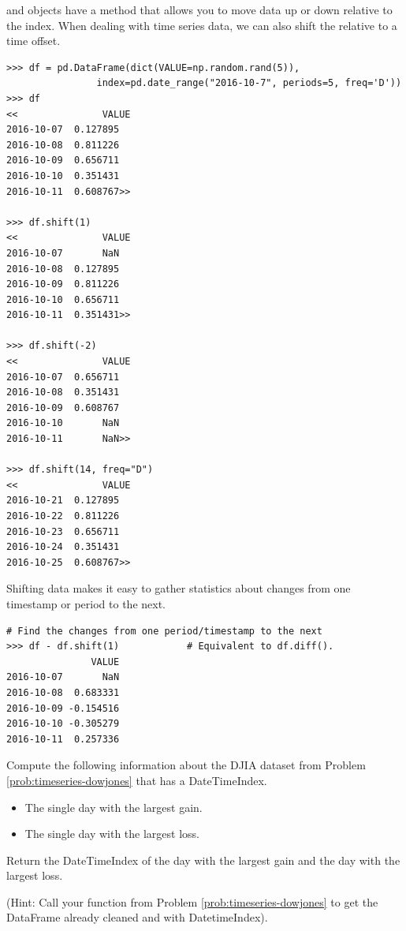  and  objects have a  method that allows you to move data up or down relative to the index.
When dealing with time series data, we can also shift the  relative to a time offset.

\begin{lstlisting}
>>> df = pd.DataFrame(dict(VALUE=np.random.rand(5)),
                index=pd.date_range("2016-10-7", periods=5, freq='D'))
>>> df
<<               VALUE
2016-10-07  0.127895
2016-10-08  0.811226
2016-10-09  0.656711
2016-10-10  0.351431
2016-10-11  0.608767>>

>>> df.shift(1)
<<               VALUE
2016-10-07       NaN
2016-10-08  0.127895
2016-10-09  0.811226
2016-10-10  0.656711
2016-10-11  0.351431>>

>>> df.shift(-2)
<<               VALUE
2016-10-07  0.656711
2016-10-08  0.351431
2016-10-09  0.608767
2016-10-10       NaN
2016-10-11       NaN>>

>>> df.shift(14, freq="D")
<<               VALUE
2016-10-21  0.127895
2016-10-22  0.811226
2016-10-23  0.656711
2016-10-24  0.351431
2016-10-25  0.608767>>
\end{lstlisting}

Shifting data makes it easy to gather statistics about changes from one timestamp or period to the next.

\begin{lstlisting}
# Find the changes from one period/timestamp to the next
>>> df - df.shift(1)            # Equivalent to df.diff().
               VALUE
2016-10-07       NaN
2016-10-08  0.683331
2016-10-09 -0.154516
2016-10-10 -0.305279
2016-10-11  0.257336
\end{lstlisting}

\begin{problem}
Compute the following information about the DJIA dataset from Problem \ref{prob:timeseries-dowjones} that has a DateTimeIndex.
\begin{itemize}
    \item The single day with the largest gain.
    \item The single day with the largest loss.
\end{itemize}
Return the DateTimeIndex of the day with the largest gain and the day with the largest loss.

(Hint: Call your function from Problem \ref{prob:timeseries-dowjones} to get the DataFrame already cleaned and with DatetimeIndex).
\end{problem}

